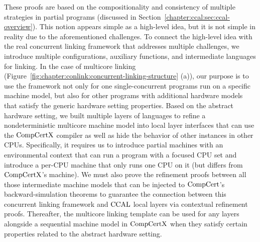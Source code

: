 These proofs are based on the compositionality and consistency of multiple strategies in partial programs (discussed in Section~\ref{chapter:ccal:sec:ccal-overview}).
This notion appears simple as a high-level idea, but it is not simple in reality due to the aforementioned challenges. 
To connect the high-level idea with the real concurrent linking framework that addresses multiple challenges, 
we introduce multiple configurations, auxiliary functions, and intermediate languages for linking. In the case of multicore linking 
(Figure~\ref{fig:chapter:conlink:concurrent-linking-structure} (a)),
our purpose is to use the framework not only for one single-concurrent programs run on a specific machine model, 
but also for other programs with additional hardware models that satisfy the generic hardware setting properties. 
Based on the abstract hardware setting, we built multiple layers of languages to refine a nondeterministic multicore machine model into  local layer interfaces that can use the $\mathrm{CompCertX}$ compiler as well as hide the behavior of other instances in other CPUs. 
Specifically, it requires us to introduce partial machines with an environmental context that can run a program with a focused CPU set and introduce a per-CPU machine that only runs one CPU on it (but differs from $\mathrm{CompCertX}$’s machine). 
We must also prove the refinement proofs between all those intermediate machine models that can be injected to $\mathrm{CompCert}$'s backward-simulation theorems to guarantee the connection between this concurrent linking framework and $\mathrm{CCAL}$ local layers via contextual refinement proofs. 
Thereafter, the multicore linking template can be used for any layers alongside a sequential machine model in $\mathrm{CompCertX}$ when they satisfy certain properties related to the abstract hardware setting.



